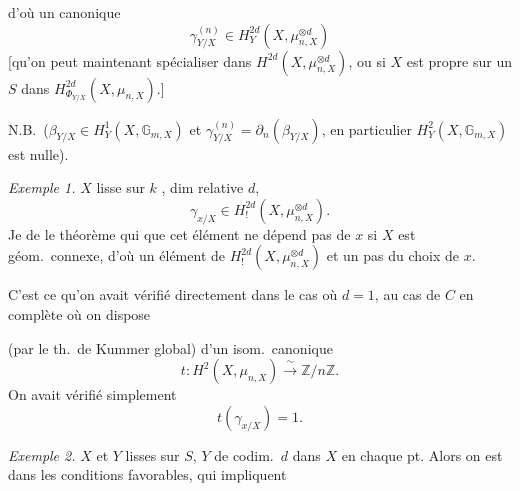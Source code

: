 \documentclass[11pt,a4paper]{article}
\begin{document}
d'où un   canonique
\[
  \gamma^{(n)}_{Y/X} \in H^{2d}_Y(X, \mu_{n,X}^{\otimes d})
\]
[qu'on peut maintenant spécialiser dans $H^{2d}(X, \mu_{n,X}^{\otimes d})$, ou si $X$ est propre sur un $S$
dans $H^{2d}_{\Phi_{Y/X}}(X, \mu_{n,X})$.]

N.B.\ ($\beta_{Y/X} \in H^1_Y(X, \mathbb{G}_{m,X})$ et $\gamma^{(n)}_{Y/X} = \partial_n(\beta_{Y/X})$, en particulier \ill{}
\ill{} $H^2_Y(X, \mathbb{G}_{m,X})$ est nulle).

\emph{Exemple 1.} $X$ lisse sur $k$ ,  dim relative $d$, 
 \ill{}
\[
  \gamma_{x/X} \in H^{2d}_{!}(X, \mu_{n,X}^{\otimes d}) .
\]
Je   de \ill{} le théorème qui \ill{} \ill{} que \struck{\ill{}} cet élément ne dépend pas de $x$
si $X$ est géom.\ connexe, d'où un élément de $H^{2d}_{!}(X, \mu_{n,X}^{\otimes d})$ et un  pas du choix de $x$.

C'est ce qu'on avait vérifié directement dans le cas où $d = 1$,  au cas de $C$
en  \ill{} \ill{} complète où on dispose 

(par le th.\ de Kummer global) d'un isom.\ canonique
\[
  t : H^2(X, \mu_{n,X}) \xrightarrow{\ \sim\ } \mathbb{Z}/n\mathbb{Z} .
\]
On avait vérifié simplement
\[
  t(\gamma_{x/X}) = 1 .
\]

\emph{Exemple 2.} $X$ et $Y$ lisses sur $S$, $Y$ de codim.\ $d$ dans $X$ en chaque pt. Alors on est dans les conditions
favorables, qui impliquent   \ill{}


\end{document}
